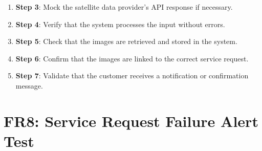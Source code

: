 \documentclass[12pt, titlepage]{article}
\begin{document}
\begin{enumerate}
\begin{itemize}
\begin{enumerate}
            \item \textbf{Step 3}: Mock the satellite data provider's API response if necessary.
            \item \textbf{Step 4}: Verify that the system processes the input without errors.
            \item \textbf{Step 5}: Check that the images are retrieved and stored in the system.
            \item \textbf{Step 6}: Confirm that the images are linked to the correct service request.
            \item \textbf{Step 7}: Validate that the customer receives a notification or confirmation message.
        \end{enumerate}
    \end{itemize}
\end{enumerate}

\section*{FR8: Service Request Failure Alert Test}
\end{document}
